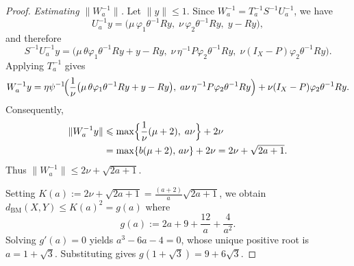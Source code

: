 \documentclass[10pt,a4paper]{amsart}
\newcommand{\BM}{\mathrm{BM}}
\newcommand{\dist}{d_{\BM}}
\renewcommand{\le}{\leqslant}
\begin{document}
\begin{proof}
\smallskip
\noindent\emph{Estimating $\|W_a^{-1}\|$.}
Let $\|y\|\le 1$.  Since $W_a^{-1}=T_a^{-1}S^{-1}U_a^{-1}$, we have
\[
U_a^{-1}y
=
\bigl(
\mu\,\varphi_1\theta^{-1}Ry,\;
\nu\,\varphi_2\theta^{-1}Ry,\;
y-Ry
\bigr),
\]
and therefore
\[
S^{-1}U_a^{-1}y
=
\bigl(
\mu\,\theta\varphi_1\theta^{-1}Ry+y-Ry,\;
\nu\,\eta^{-1}P\varphi_2\theta^{-1}Ry,\;
\nu(I_X-P)\varphi_2\theta^{-1}Ry
\bigr).
\]
Applying $T_a^{-1}$ gives
\[
W_a^{-1}y
=
\eta\psi^{-1}\!\Bigl(
\frac{1}{\nu}\bigl(\mu\,\theta\varphi_1\theta^{-1}Ry+y-Ry\bigr),\;
a\nu\,\eta^{-1}P\varphi_2\theta^{-1}Ry
\Bigr)
+
\nu(I_X-P)\varphi_2\theta^{-1}Ry.
\]
Consequently,
\begin{align*}
\|W_a^{-1}y\|
&\le
\max\Bigl\{
\frac{1}{\nu}(\mu+2),\;
a\nu
\Bigr\}
+2\nu \\
&=
\max\{b(\mu+2),\,a\nu\}+2\nu
=
2\nu+\sqrt{2a+1}.
\end{align*}
Thus $\|W_a^{-1}\|\le 2\nu+\sqrt{2a+1}$.

\smallskip
Setting $K(a):=2\nu+\sqrt{2a+1}=\frac{(a+2)}{a}\sqrt{2a+1}$,
we obtain $\dist(X,Y)\le K(a)^2=g(a)$ where
\[
g(a):=2a+9+\frac{12}{a}+\frac{4}{a^2}.
\]
Solving $g'(a)=0$ yields $a^3-6a-4=0$, whose unique positive root is
$a=1+\sqrt{3}$.  Substituting gives $g(1+\sqrt{3})=9+6\sqrt{3}$.
\end{proof}
\end{document}
